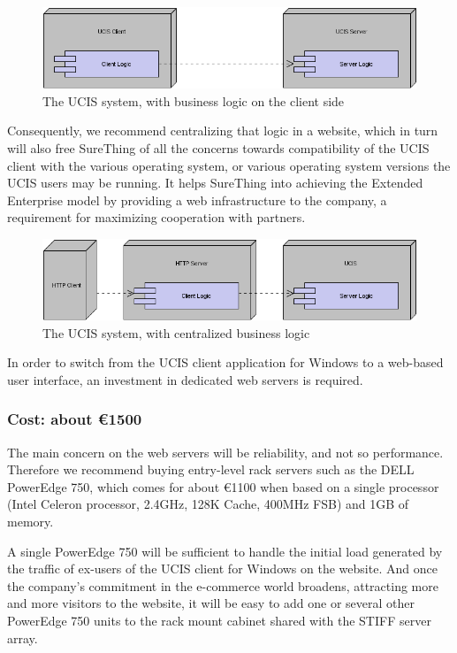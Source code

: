 \begin{figure}
\includegraphics[width=\linewidth]{img/net_2_before.png}
\caption{The UCIS system, with business logic on the client side}
\label{fig:net_2_before}
\end{figure}

Consequently, we recommend centralizing that logic in a website, which
in turn will also free SureThing of all the concerns towards compatibility of
the UCIS client with the various operating system, or various operating system
versions the UCIS users may be running. It helps SureThing into achieving the
Extended Enterprise model by providing a web infrastructure to the
company, a requirement for maximizing cooperation with partners.

\begin{figure}
\includegraphics[width=\linewidth]{img/net_2_after.png}
\caption{The UCIS system, with centralized business logic}
\label{fig:net_2_after}
\end{figure}

In order to switch from the UCIS client application for Windows to a
web-based user interface, an investment in dedicated web servers is
required.

\subsubsection*{Cost: about \euro1500}

The main concern on the web servers will be reliability, and not so
performance. Therefore we recommend buying entry-level rack servers
such as the DELL PowerEdge 750, which comes for about \euro1100
when based on a single processor (Intel Celeron processor, 2.4GHz,
128K Cache, 400MHz FSB) and 1GB of memory.

A single PowerEdge 750 will be sufficient to handle the initial load
generated by the traffic of ex-users of the UCIS client for Windows
on the website. And once the company's commitment in the e-commerce
world broadens, attracting more and more visitors to the website, it
will be easy to add one or several other PowerEdge 750 units to the
rack mount cabinet shared with the STIFF server array.

